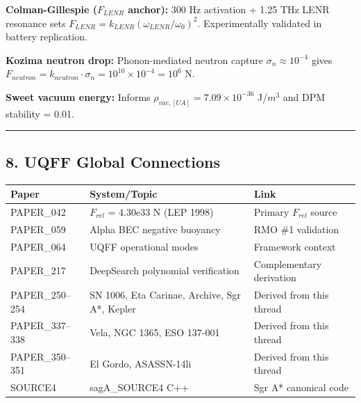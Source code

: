 \documentclass[
  11pt,
]{article}
\newcounter{none} %
\begin{document}
\textbf{Colman-Gillespie (\(F_{LENR}\) anchor):} 300 Hz activation +
1.25 THz LENR resonance sets
\(F_{LENR} = k_{LENR}(\omega_{LENR}/\omega_0)^2\). Experimentally
validated in battery replication.

\textbf{Kozima neutron drop:} Phonon-mediated neutron capture
\(\sigma_n \approx 10^{-4}\) gives
\(F_{neutron} = k_{neutron} \cdot \sigma_n = 10^{10} \times 10^{-4} = 10^6\)
N.

\textbf{Sweet vacuum energy:} Informs
\(\rho_{vac,[UA]} = 7.09 \times 10^{-36}\) J/\(m^3\) and DPM stability =
0.01.

\begin{center}\rule{0.5\linewidth}{0.5pt}\end{center}

\subsection{8. UQFF Global Connections}\label{uqff-global-connections}

{\def\LTcaptype{none} %
\begin{longtable}[]{@{}
  >{\raggedright\arraybackslash}p{}
  >{\raggedright\arraybackslash}p{}
  >{\raggedright\arraybackslash}p{}@{}}
\toprule\noalign{}
\begin{minipage}[b]{\linewidth}\raggedright
Paper
\end{minipage} & \begin{minipage}[b]{\linewidth}\raggedright
System/Topic
\end{minipage} & \begin{minipage}[b]{\linewidth}\raggedright
Link
\end{minipage} \\
\midrule\noalign{}
\endhead
\bottomrule\noalign{}
\endlastfoot
PAPER\_042 & \(F_{rel}\) = 4.30e33 N (LEP 1998) & Primary \(F_{rel}\)
source \\
PAPER\_059 & Alpha BEC negative buoyancy & RMO \#1 validation \\
PAPER\_064 & 4 UQFF operational modes & Framework context \\
PAPER\_217 & DeepSearch polynomial verification & Complementary
derivation \\
PAPER\_250--254 & SN 1006, Eta Carinae, Archive, Sgr A*, Kepler &
Derived from this thread \\
PAPER\_337--338 & Vela, NGC 1365, ESO 137-001 & Derived from this
thread \\
PAPER\_350--351 & El Gordo, ASASSN-14li & Derived from this thread \\
SOURCE4 & sagA\_SOURCE4 C++ & Sgr A* canonical code \\
\end{longtable}
}
\end{document}

